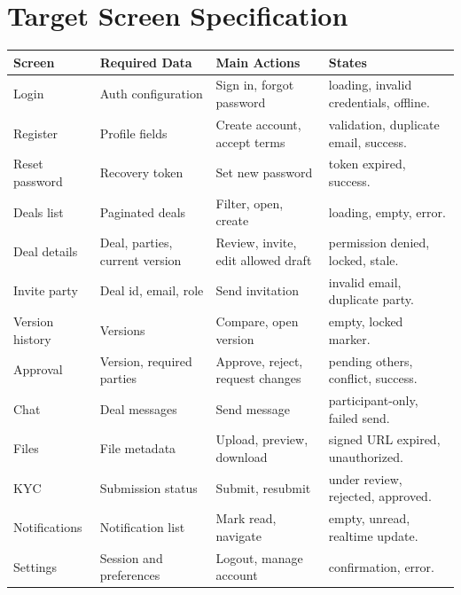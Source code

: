 \section{Target Screen Specification}
\begin{longtable}{p{}p{}p{}p{}}
\toprule
Screen & Required Data & Main Actions & States \\
\midrule
Login & Auth configuration & Sign in, forgot password & loading, invalid credentials, offline. \\
Register & Profile fields & Create account, accept terms & validation, duplicate email, success. \\
Reset password & Recovery token & Set new password & token expired, success. \\
Deals list & Paginated deals & Filter, open, create & loading, empty, error. \\
Deal details & Deal, parties, current version & Review, invite, edit allowed draft & permission denied, locked, stale. \\
Invite party & Deal id, email, role & Send invitation & invalid email, duplicate party. \\
Version history & Versions & Compare, open version & empty, locked marker. \\
Approval & Version, required parties & Approve, reject, request changes & pending others, conflict, success. \\
Chat & Deal messages & Send message & participant-only, failed send. \\
Files & File metadata & Upload, preview, download & signed URL expired, unauthorized. \\
KYC & Submission status & Submit, resubmit & under review, rejected, approved. \\
Notifications & Notification list & Mark read, navigate & empty, unread, realtime update. \\
Settings & Session and preferences & Logout, manage account & confirmation, error. \\
\bottomrule
\end{longtable}
